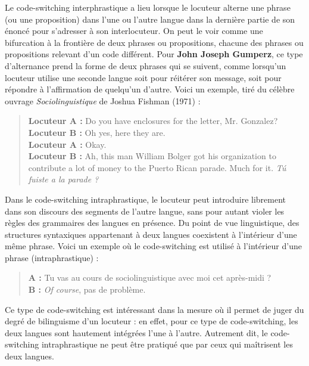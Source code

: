 Le code-switching interphrastique a lieu lorsque le locuteur alterne une phrase (ou une proposition) dans l’une ou l’autre langue dans la dernière partie de son énoncé pour s’adresser à son interlocuteur. On peut le voir comme une bifurcation à la frontière de deux phrases ou propositions, chacune des phrases ou propositions relevant d’un code différent. Pour \textbf{John Joseph Gumperz}, ce type d’alternance prend la forme de deux phrases qui se suivent, comme lorsqu’un locuteur utilise une seconde langue soit pour réitérer son message, soit pour répondre à l’affirmation de quelqu’un d’autre. Voici un exemple, tiré du célèbre ouvrage \textit{Sociolinguistique} de Joshua Fishman (1971) :

\begin{quote}\small
\textbf{Locuteur A :} Do you have enclosures for the letter, Mr. Gonzalez?\\
\textbf{Locuteur B :} Oh yes, here they are.\\
\textbf{Locuteur A :} Okay.\\[.3em]
\textbf{Locuteur B :} Ah, this man William Bolger got his organization to contribute a lot of money to the Puerto Rican parade. Much for it. \textit{Tú fuiste a la parade ?}
\end{quote}

Dans le code-switching intraphrastique, le locuteur peut introduire librement dans son discours des segments de l’autre langue, sans pour autant violer les règles des grammaires des langues en présence. Du point de vue linguistique, des structures syntaxiques appartenant à deux langues coexistent à l’intérieur d’une même phrase. Voici un exemple où le code-switching est utilisé à l’intérieur d’une phrase (intraphrastique) :

\begin{quote}\small
\textbf{A :} Tu vas au cours de sociolinguistique avec moi cet après-midi ?\\
\textbf{B :} \textit{Of course}, pas de problème.
\end{quote}

Ce type de code-switching est intéressant dans la mesure où il permet de juger du degré de
bilinguisme d’un locuteur : en effet, pour ce type de code-switching, les deux langues sont hautement intégrées l’une à l’autre. Autrement dit, le code-switching intraphrastique ne peut être pratiqué que par ceux qui maîtrisent les deux langues.

